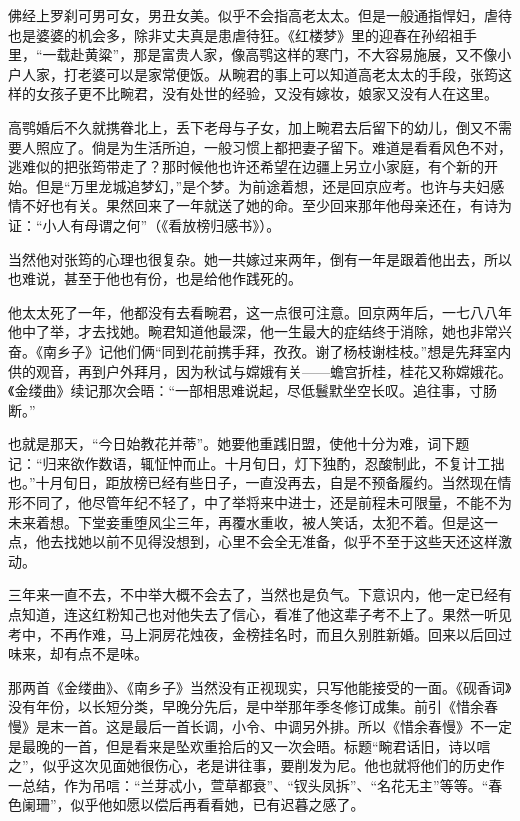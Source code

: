 \par 佛经上罗刹可男可女，男丑女美。似乎不会指高老太太。但是一般通指悍妇，虐待也是婆婆的机会多，除非丈夫真是患虐待狂。《红楼梦》里的迎春在孙绍祖手里，“一载赴黄粱”，那是富贵人家，像高鹗这样的寒门，不大容易施展，又不像小户人家，打老婆可以是家常便饭。从畹君的事上可以知道高老太太的手段，张筠这样的女孩子更不比畹君，没有处世的经验，又没有嫁妆，娘家又没有人在这里。
\par 高鹗婚后不久就携眷北上，丢下老母与子女，加上畹君去后留下的幼儿，倒又不需要人照应了。倘是为生活所迫，一般习惯上都把妻子留下。难道是看看风色不对，逃难似的把张筠带走了？那时候他也许还希望在边疆上另立小家庭，有个新的开始。但是“万里龙城追梦幻，”是个梦。为前途着想，还是回京应考。也许与夫妇感情不好也有关。果然回来了一年就送了她的命。至少回来那年他母亲还在，有诗为证：“小人有母谓之何”（《看放榜归感书》）。
\par 当然他对张筠的心理也很复杂。她一共嫁过来两年，倒有一年是跟着他出去，所以也难说，甚至于他也有份，也是给他作践死的。
\par 他太太死了一年，他都没有去看畹君，这一点很可注意。回京两年后，一七八八年他中了举，才去找她。畹君知道他最深，他一生最大的症结终于消除，她也非常兴奋。《南乡子》记他们俩“同到花前携手拜，孜孜。谢了杨枝谢桂枝。”想是先拜室内供的观音，再到户外拜月，因为秋试与嫦娥有关——蟾宫折桂，桂花又称嫦娥花。《金缕曲》续记那次会晤：“一部相思难说起，尽低鬟默坐空长叹。追往事，寸肠断。”
\par 也就是那天，“今日始教花并蒂”。她要他重践旧盟，使他十分为难，词下题记：“归来欲作数语，辄怔忡而止。十月旬日，灯下独酌，忍酸制此，不复计工拙也。”十月旬日，距放榜已经有些日子，一直没再去，自是不预备履约。当然现在情形不同了，他尽管年纪不轻了，中了举将来中进士，还是前程未可限量，不能不为未来着想。下堂妾重堕风尘三年，再覆水重收，被人笑话，太犯不着。但是这一点，他去找她以前不见得没想到，心里不会全无准备，似乎不至于这些天还这样激动。
\par 三年来一直不去，不中举大概不会去了，当然也是负气。下意识内，他一定已经有点知道，连这红粉知己也对他失去了信心，看准了他这辈子考不上了。果然一听见考中，不再作难，马上洞房花烛夜，金榜挂名时，而且久别胜新婚。回来以后回过味来，却有点不是味。
\par 那两首《金缕曲》、《南乡子》当然没有正视现实，只写他能接受的一面。《砚香词》没有年份，以长短分类，早晚分先后，是中举那年季冬修订成集。前引《惜余春慢》是末一首。这是最后一首长调，小令、中调另外排。所以《惜余春慢》不一定是最晚的一首，但是看来是坠欢重拾后的又一次会晤。标题“畹君话旧，诗以唁之”，似乎这次见面她很伤心，老是讲往事，要削发为尼。他也就将他们的历史作一总结，作为吊唁：“兰芽忒小，萱草都衰”、“钗头凤拆”、“名花无主”等等。“春色阑珊”，似乎他如愿以偿后再看看她，已有迟暮之感了。
